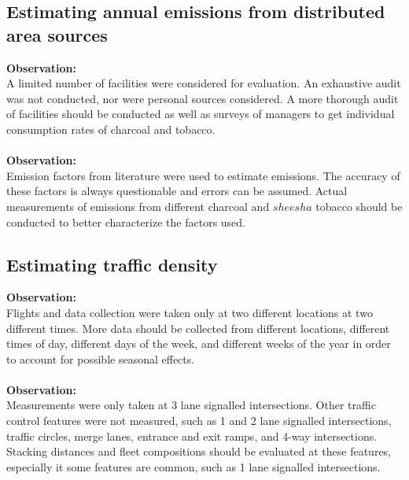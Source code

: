 \subsection*{Estimating annual emissions from distributed area sources}
\noindent
\textbf{Observation:}\\
A limited number of facilities were considered for evaluation. An exhaustive audit was not conducted, nor were personal sources considered. A more thorough audit of facilities should be conducted as well as surveys of managers to get individual consumption rates of charcoal and tobacco. \\
\noindent\\
\textbf{Observation:}\\
Emission factors from literature were used to estimate emissions. The accuracy of these factors is always questionable and errors can be assumed. Actual measurements of emissions from different charcoal and $sheesha$ tobacco should be conducted to better characterize the factors used.\\

\subsection*{Estimating traffic density}
\noindent
\textbf{Observation:}\\
Flights and data collection were taken only at two different locations at two different times. More data should be collected from different locations, different times of day,  different days of the week, and different weeks of the year in order to account for possible seasonal effects. \\
\noindent\\
\textbf{Observation:}\\
Measurements were only taken at 3 lane signalled intersections. Other traffic control features were not measured, such as 1 and 2 lane signalled intersections, traffic circles, merge lanes, entrance and exit ramps, and 4-way intersections.  Stacking distances and fleet compositions should be evaluated at these features, especially it some features are common, such as 1 lane signalled intersections.
\\

